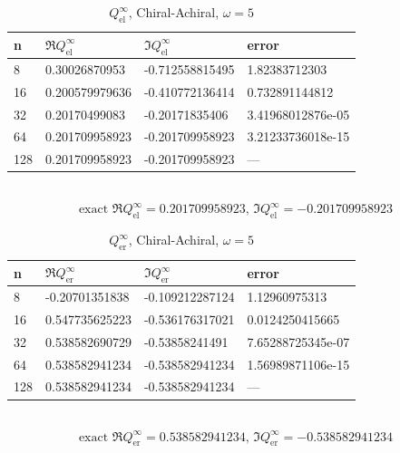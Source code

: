\begin{table}
  \centering
  \renewcommand{\arraystretch}{1.1}
  \caption{$Q_\text{el}^\infty$, Chiral-Achiral, $\omega=5$}
  \begin{tabular}{@{}llll@{}}
    \toprule
    n & $\Re{Q_\text{el}^\infty}$ & $\Im{Q_\text{el}^\infty}$ & error \\
    \midrule
8 & 0.30026870953 & -0.712558815495 & 1.82383712303\\ 
16 & 0.200579979636 & -0.410772136414 & 0.732891144812\\ 
32 & 0.20170499083 & -0.20171835406 & 3.41968012876e-05\\ 
64 & 0.201709958923 & -0.201709958923 & 3.21233736018e-15\\ 
128 & 0.201709958923 & -0.201709958923 & ---\\%
    \bottomrule
  \end{tabular}
  \\ 
  $$\text{exact }\Re{Q_\text{el}^\infty}=0.201709958923,\,\Im{Q_\text{el}^\infty}=-0.201709958923$$  
\end{table}

\begin{table}
  \centering
  \renewcommand{\arraystretch}{1.1}
  \caption{$Q_\text{er}^\infty$, Chiral-Achiral, $\omega=5$}
  \begin{tabular}{@{}llll@{}}
    \toprule
    n & $\Re{Q_\text{er}^\infty}$ & $\Im{Q_\text{er}^\infty}$ & error \\
    \midrule
8 & -0.20701351838 & -0.109212287124 & 1.12960975313\\ 
16 & 0.547735625223 & -0.536176317021 & 0.0124250415665\\ 
32 & 0.538582690729 & -0.53858241491 & 7.65288725345e-07\\ 
64 & 0.538582941234 & -0.538582941234 & 1.56989871106e-15\\ 
128 & 0.538582941234 & -0.538582941234 & ---\\%
    \bottomrule
  \end{tabular}
  \\ 
  $$\text{exact }\Re{Q_\text{er}^\infty}=0.538582941234,\,\Im{Q_\text{er}^\infty}=-0.538582941234$$  
\end{table}

